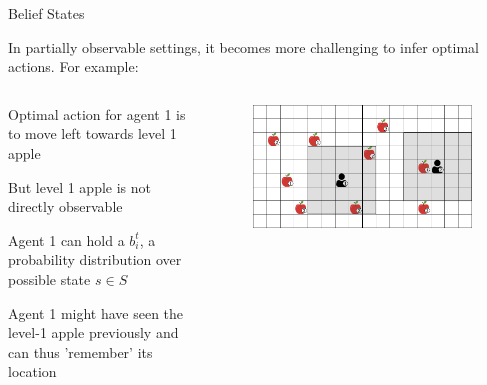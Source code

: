 \begin{frame}{Belief States}

    In partially observable settings, it becomes more challenging to infer optimal actions. For example:

    \begin{columns}
    \begin{column}{0.6\textwidth}
    \vspace{10pt}
        \blist 
            \item Optimal action for agent 1 is to move left towards level 1 apple
            \item But level 1 apple is not directly observable 
            \item Agent 1 can hold a  \(b_{i}^{t}\), a probability distribution over possible state \(s \in S\)
            \item Agent 1 might have seen the level-1 apple previously and can thus 'remember' its location
        \elist  
    \end{column}
    \begin{column}{0.4\textwidth}
    \begin{figure}
        \centering
        \includegraphics[width = \linewidth]{images/environments/lbf/foraging_po.png}
    \end{figure}
    \end{column}
    \end{columns}   
\end{frame}

